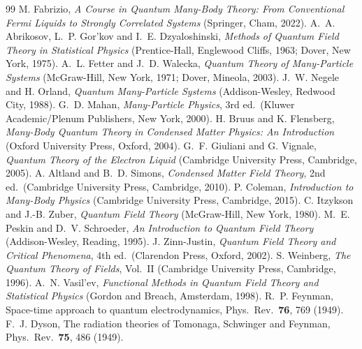 \documentclass[11pt,a4paper]{article}
\begin{document}
\begingroup
\small
\renewcommand{\section}[2]{}
\begin{thebibliography}{99}
\setlength{\itemsep}{0.5pt}
 M. Fabrizio, \emph{A Course in Quantum Many-Body Theory: From Conventional Fermi Liquids to Strongly Correlated Systems} (Springer, Cham, 2022).
 A.~A. Abrikosov, L.~P. Gor'kov and I.~E. Dzyaloshinski, \emph{Methods of Quantum Field Theory in Statistical Physics} (Prentice-Hall, Englewood Cliffs, 1963; Dover, New York, 1975).
 A.~L. Fetter and J.~D. Walecka, \emph{Quantum Theory of Many-Particle Systems} (McGraw-Hill, New York, 1971; Dover, Mineola, 2003).
 J.~W. Negele and H. Orland, \emph{Quantum Many-Particle Systems} (Addison-Wesley, Redwood City,
  1988).
 G.~D. Mahan, \emph{Many-Particle Physics}, 3rd ed.\ (Kluwer Academic/Plenum Publishers, New York, 2000).
 H. Bruus and K. Flensberg, \emph{Many-Body Quantum Theory in Condensed Matter Physics: An Introduction} (Oxford University Press, Oxford, 2004).
 G.~F. Giuliani and G. Vignale, \emph{Quantum Theory of the Electron Liquid} (Cambridge University Press, Cambridge, 2005).
 A. Altland and B.~D. Simons, \emph{Condensed Matter Field Theory}, 2nd ed.\ (Cambridge University Press, Cambridge, 2010).
 P. Coleman, \emph{Introduction to Many-Body Physics} (Cambridge University Press, Cambridge, 2015).
 C. Itzykson and J.-B. Zuber, \emph{Quantum Field Theory} (McGraw-Hill, New York, 1980).
 M.~E. Peskin and D.~V. Schroeder, \emph{An Introduction to Quantum Field Theory} (Addison-Wesley, Reading, 1995).
 J. Zinn-Justin, \emph{Quantum Field Theory and Critical Phenomena}, 4th ed.\ (Clarendon Press,
  Oxford, 2002).
 S. Weinberg, \emph{The Quantum Theory of Fields}, Vol.~II (Cambridge University Press, Cambridge,
  1996).
 A.~N. Vasil'ev, \emph{Functional Methods in Quantum Field Theory and Statistical Physics} (Gordon and Breach, Amsterdam, 1998).
 R.~P. Feynman, Space-time approach to quantum electrodynamics, Phys.\ Rev.\ \textbf{76}, 769 (1949).
 F.~J. Dyson, The radiation theories of Tomonaga, Schwinger and Feynman, Phys.\ Rev.\ \textbf{75}, 486 (1949).

\end{thebibliography}
\end{document}
